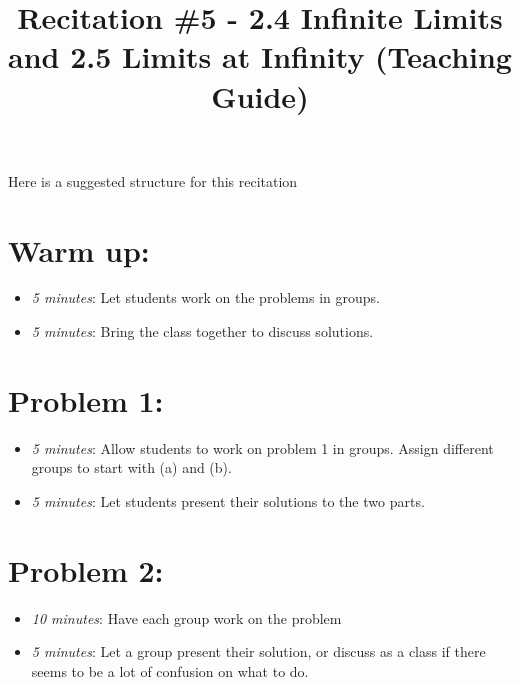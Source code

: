\documentclass[handout,nooutcomes]{ximera}
\title{Recitation \#5 - 2.4 Infinite Limits and 2.5 Limits at Infinity (Teaching Guide)}
\begin{document}
\begin{abstract}		\end{abstract}
\maketitle

Here is a suggested structure for this recitation

\section*{Warm up:} 

	\begin{itemize}
	
	\item  \emph{5 minutes}:  Let students work on the problems in groups.
	
	\item  \emph{5 minutes}:   Bring the class together to discuss solutions.
	
	\end{itemize}


\section*{Problem 1:}

	\begin{itemize}
	
	\item  \emph{5 minutes}:  Allow students to work on problem 1 in groups.  Assign different groups to start with (a) and (b).
	
	\item  \emph{5 minutes}:  Let students present their solutions to the two parts.  
		
	\end{itemize}
	
	
	
\section*{Problem 2:}

	\begin{itemize}
	
	\item  \emph{10 minutes}:  Have each group work on the problem
	
	\item  \emph{5 minutes}:  Let a group present their solution, or discuss as a class if there seems to be a lot of confusion on what to do.
	
	\end{itemize}
	
\end{document}
